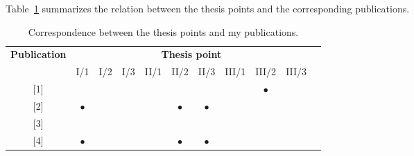 \documentclass[12pt,a4paper]{extarticle}
\begin{document}
\vspace*{1em}
\noindent
Table~\ref{tab:summary_table} summarizes the relation between the thesis points and the corresponding publications.
\vspace*{2em}

\begin{table}[h!]
\centering
\caption{Correspondence between the thesis points and my publications.}
\label{tab:summary_table}
\begin{tabular}{|c|c|c|c|c|c|c|c|c|c|c|}
\hline
\multirow{2}{*}{\textbf{Publication}} & \multicolumn{9}{c|}{\textbf{Thesis point}}                                                                                                                                                                                                                                        \\
                                      & \multicolumn{1}{c|}{I/1}       & \multicolumn{1}{c|}{I/2}       & \multicolumn{1}{c|}{I/3}       & \multicolumn{1}{c|}{II/1}      & \multicolumn{1}{c|}{II/2}      & \multicolumn{1}{c|}{II/3}      & \multicolumn{1}{c|}{III/1}     & \multicolumn{1}{c|}{III/2}     & III/3     \\ \hline
{[}1{]}                               & \multicolumn{1}{c|}{}          & \multicolumn{1}{c|}{}          & \multicolumn{1}{c|}{}          & \multicolumn{1}{c|}{}          & \multicolumn{1}{c|}{}          & \multicolumn{1}{c|}{}          & \multicolumn{1}{c|}{}          & \multicolumn{1}{c|}{$\bullet$} &           \\ \hline
{[}2{]}                               & \multicolumn{1}{c|}{$\bullet$} & \multicolumn{1}{c|}{}          & \multicolumn{1}{c|}{}          & \multicolumn{1}{c|}{}          & \multicolumn{1}{c|}{$\bullet$} & \multicolumn{1}{c|}{$\bullet$} & \multicolumn{1}{c|}{}          & \multicolumn{1}{c|}{}          &           \\ \hline
{[}3{]}                               & \multicolumn{1}{c|}{}          & \multicolumn{1}{c|}{}          & \multicolumn{1}{c|}{}          & \multicolumn{1}{c|}{}          & \multicolumn{1}{c|}{}          & \multicolumn{1}{c|}{}          & \multicolumn{1}{c|}{}          & \multicolumn{1}{c|}{}          &           \\ \hline
{[}4{]}                               & \multicolumn{1}{c|}{$\bullet$} & \multicolumn{1}{c|}{}          & \multicolumn{1}{c|}{}          & \multicolumn{1}{c|}{}          & \multicolumn{1}{c|}{$\bullet$} & \multicolumn{1}{c|}{$\bullet$} & \multicolumn{1}{c|}{}          & \multicolumn{1}{c|}{}          &           \\ \hline

\end{tabular}
\end{table}
\end{document}
